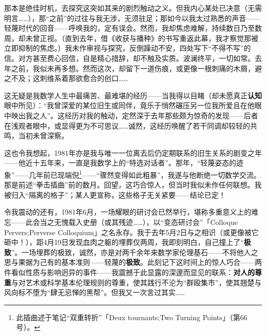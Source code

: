 那本是绝佳时机，去探究这突如其来的剧烈触动之义。但我内心某处已决意（无需明言……），那“之前”的过往与我无涉，无须驻足；那如今以我太过熟悉的声音——轻蔑时代的回音——呼唤我的，定有误会。然而，我却焦虑难解，持续数日乃至数周，却未曾正视。（直到去年，借《收获与播种》的书写重返此幕，我才察觉那被立即抑制的焦虑。）我未作审视与探究，反倒躁动不安，四处写下``不得不写''的信。对方甚至费心回信，自是精心措辞，却不触及实质。波澜终平，一切如常。去年之前，我似未再多想。然而这次，却留下一道伤痕，或更像一根刺痛的木屑，避之不及；这刺维系着那欲愈合的创口……

这无疑是我数学人生中最痛苦、最难堪的经历——当我得以目睹（却未愿真正\textbf{认知}眼中所见）：“我曾深爱的某位旧生或同伴，竟乐于悄然碾压另一位我所爱且在他眼中映出我之人”。这经历对我的触动，定然深于去年那些颇为惊奇的发现——后者在浅观者眼中，或显得更为不可思议……诚然，这经历唤醒了若干同调却较轻的共鸣，当初未曾深察。

这也令我想起，1981年亦是我与唯一一位离去后仍定期联系的旧生关系的剧变之年——他近十五年来，一直是我数学上的``特选对话者''。那年，“轻蔑姿态的迹象”——几年前已现端倪\footnote{此插曲述于笔记“双重转折”「Deux tournants;Two Turning Points」（第66号）。}——“骤然变得如此粗暴”，我遂与他断绝一切数学交流。那是前述“拳击插曲”前的数月。回望，这巧合惊人，但当时我似未作任何联想。我被归入“隔离的格子”；某人更宣称，这些格子无关紧要——结论已定！

令我震动的还有，1981年6月，一场耀眼的研讨会已然举行，堪称多重意义上的难忘——此会当之无愧载入史册（或其残迹……），以“变态研讨会”「Colloque Pervers;Perverse Colloquium」之名永存。我于去年5月2日与之相识（或更像被它砸中！），距4月19日发现血肉之躯的埋葬仅两周，我即刻明白，自己撞上了“\textbf{极致}”。一场埋葬的极致，诚然，亦是对两千余年来数学家伦理基石——不将他人之思与果据为己有的基本准则——轻蔑的\textbf{极致}。此刻记下这时间上的惊人巧合——两件看似性质与影响迥异的事件——我震撼于此显露的深邃而显见的联系：\textbf{对人的尊重}与对艺术或科学基本伦理规则的尊重，使其践行不沦为``群殴集市''，使其翘楚与风向标不堕为``肆无忌惮的黑帮''。但我又一次言过其实……